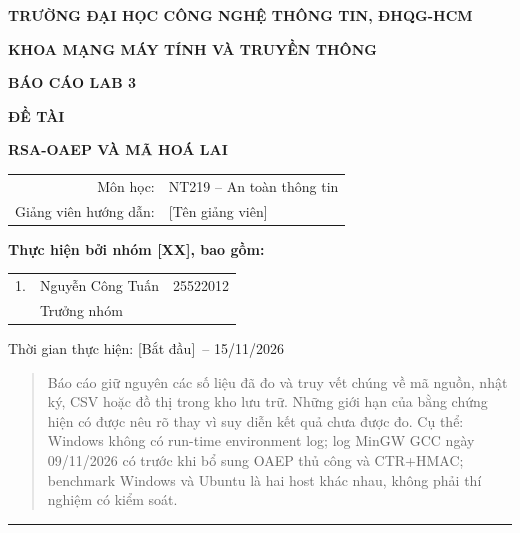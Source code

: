\documentclass[12pt,a4paper,oneside]{report}
\newcommand{\ReportNumber}{3}
\newcommand{\ReportTitle}{RSA-OAEP VÀ MÃ HOÁ LAI}
\newcommand{\ReportCourse}{NT219 -- An toàn thông tin}
\newcommand{\ReportInstructor}{[Tên giảng viên]}
\newcommand{\GroupNumber}{[XX]}
\newcommand{\ReportStudent}{Nguyễn Công Tuấn}
\newcommand{\ReportId}{25522012}
\newcommand{\ReportRole}{Trưởng nhóm}
\newcommand{\ReportStart}{[Bắt đầu]}
\newcommand{\ReportEnd}{15/11/2026}
\begin{document}
\begin{titlepage}
\thispagestyle{empty}
\begin{center}
{\large\bfseries TRƯỜNG ĐẠI HỌC CÔNG NGHỆ THÔNG TIN, ĐHQG-HCM\par}
\vspace{0.3cm}
{\large\bfseries KHOA MẠNG MÁY TÍNH VÀ TRUYỀN THÔNG\par}
\vspace{2.0cm}
{\Large\bfseries BÁO CÁO LAB \ReportNumber\par}
\vspace{0.8cm}
{\LARGE\bfseries ĐỀ TÀI\par}
\vspace{0.3cm}
{\Large\bfseries \ReportTitle\par}
\vspace{1.5cm}
\begin{tabular}{rl}
Môn học: & \ReportCourse\\
Giảng viên hướng dẫn: & \ReportInstructor\\
\end{tabular}
\vspace{1.2cm}

{\bfseries Thực hiện bởi nhóm \GroupNumber, bao gồm:}\\[0.4cm]
\begin{tabular}{rll}
1. & \ReportStudent & \ReportId \\
   & \multicolumn{2}{l}{\ReportRole} \\
\end{tabular}

\vfill
Thời gian thực hiện: \ReportStart\ -- \ReportEnd\par
\end{center}
\end{titlepage}
\tableofcontents
\clearpage



\begin{quote}
Báo cáo giữ nguyên các số liệu đã đo và truy vết chúng về mã nguồn, nhật ký, CSV hoặc đồ thị trong kho lưu trữ. Những giới hạn của bằng chứng hiện có được nêu rõ thay vì suy diễn kết quả chưa được đo. Cụ thể: Windows không có run-time environment log; log MinGW GCC ngày 09/11/2026 có trước khi bổ sung OAEP thủ công và CTR+HMAC; benchmark Windows và Ubuntu là hai host khác nhau, không phải thí nghiệm có kiểm soát.
\end{quote}


\par\noindent\rule{\textwidth}{0.4pt}
\end{document}
